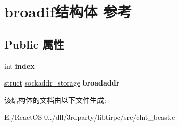 \hypertarget{structbroadif}{}\section{broadif结构体 参考}
\label{structbroadif}
\subsection*{Public 属性}
\begin{DoxyCompactItemize}
\item 
\mbox{\label{structbroadif_aa66d85807d41a9ff152d0ffbaf0f5223}} 
int {\bfseries index}
\item 
\mbox{\label{structbroadif_a1deec7c9f3d99737038bd39179668089}} 
\hyperlink{interfacestruct}{struct} \hyperlink{structsockaddr__storage}{sockaddr\+\_\+storage} {\bfseries broadaddr}
\end{DoxyCompactItemize}


该结构体的文档由以下文件生成\+:\begin{DoxyCompactItemize}
\item 
E\+:/\+React\+O\+S-\/0../dll/3rdparty/libtirpc/src/clnt\+\_\+bcast.\+c\end{DoxyCompactItemize}
